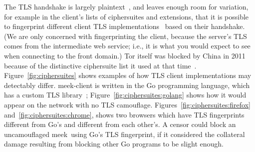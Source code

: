 \documentclass[conference]{IEEEtran}
\newcommand{\meekclient}{\mbox{meek-client}\xspace}
\newcommand{\meek}{meek\xspace}
\begin{document}
The TLS handshake is largely plaintext~\cite[Section~7.4]{rfc5246}, and leaves
enough room for variation, for example in
the client's lists of ciphersuites and extensions,
that it is possible to fingerprint different client TLS implementations~\cite{ssl-p0f}
based on their handshake.
(We are only concerned with fingerprinting the client,
because the server's TLS
comes from the intermediate web service;
i.e., it is what you would expect to see when connecting to the front domain.)
Tor itself was blocked by China in 2011
because of the distinctive ciphersuite list it used at that time~\cite{bug4744}.
Figure~\ref{fig:ciphersuites} shows examples of how TLS client
implementations may detectably differ.
\meekclient is written in the Go programming language,
which has a custom TLS library~\cite{golang-crypto/tls};
Figure~\ref{fig:ciphersuites:golang}
shows how it would appear on the network with no TLS camouflage.
Figures~\ref{fig:ciphersuites:firefox} and~\ref{fig:ciphersuites:chrome},
shows two browsers which have TLS fingerprints different from Go's
and different from each other's.
A censor could block an uncamouflaged \meek\ using Go's TLS fingerprint,
if it considered the collateral damage resulting from blocking other Go programs to be slight enough.
\end{document}
